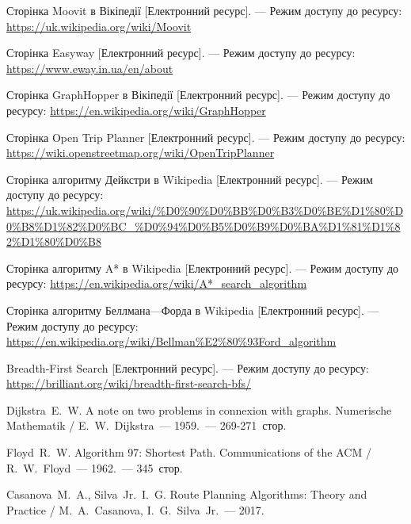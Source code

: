 \begin{thebibliography}
	
	 Сторінка Moovit в Вікіпедії [Електронний ресурс]. --- Режим доступу до ресурсу:
	\url{https://uk.wikipedia.org/wiki/Moovit}

	 Сторінка Easyway [Електронний ресурс]. --- Режим доступу до ресурсу:
	\url{https://www.eway.in.ua/en/about}

	 Сторінка GraphHopper в Вікіпедії [Електронний ресурс]. --- Режим доступу до ресурсу:
	\url{https://en.wikipedia.org/wiki/GraphHopper}

	 Сторінка Open Trip Planner [Електронний ресурс]. --- Режим доступу до ресурсу:
	\url{https://wiki.openstreetmap.org/wiki/OpenTripPlanner}

	 Сторінка алгоритму Дейкстри в Wikipedia [Електронний ресурс]. --- Режим доступу до ресурсу:
	\url{https://uk.wikipedia.org/wiki/%D0%90%D0%BB%D0%B3%D0%BE%D1%80%D0%B8%D1%82%D0%BC_%D0%94%D0%B5%D0%B9%D0%BA%D1%81%D1%82%D1%80%D0%B8}

	 Сторінка алгоритму A* в Wikipedia [Електронний ресурс]. --- Режим доступу до ресурсу:
	\url{https://en.wikipedia.org/wiki/A*_search_algorithm}

	 Сторінка алгоритму Беллмана—Форда в Wikipedia [Електронний ресурс]. --- Режим доступу до ресурсу:
	\url{https://en.wikipedia.org/wiki/Bellman%E2%80%93Ford_algorithm}

	 Breadth-First Search [Електронний ресурс]. --- Режим доступу до ресурсу:
	\url{https://brilliant.org/wiki/breadth-first-search-bfs/}

	 Dijkstra~E.~W. A note on two problems in connexion with graphs. Numerische Mathematik / E.~W.~Dijkstra~--- 1959.~--- 269-271~стор.
	
	 Floyd~R.~W. Algorithm 97: Shortest Path. Communications of the ACM / R.~W.~Floyd~--- 1962.~--- 345~стор.

	 Casanova~M.~A., Silva~Jr.~I.~G. Route Planning Algorithms: Theory and Practice / M.~A.~Casanova, I.~G.~Silva~Jr.~--- 2017.

\end{thebibliography}
